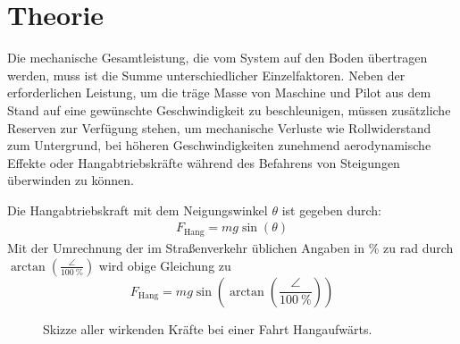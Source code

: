 \chapter{Theorie}
	Die mechanische Gesamtleistung, die vom System auf den Boden übertragen werden, muss ist die Summe unterschiedlicher Einzelfaktoren.
	Neben der erforderlichen Leistung, um die träge Masse von Maschine und Pilot aus dem Stand auf eine gewünschte Geschwindigkeit zu beschleunigen, müssen zusätzliche Reserven zur Verfügung stehen, um mechanische Verluste wie Rollwiderstand zum Untergrund, bei höheren Geschwindigkeiten zunehmend aerodynamische Effekte oder Hangabtriebskräfte während des Befahrens von Steigungen überwinden zu können.\par\medskip
	Die Hangabtriebskraft mit dem Neigungswinkel \(\theta\) ist gegeben durch:
	\begin{align}
		F_\text{Hang} = m g \sin\left(\theta\right)
		\label{eq:downhill force}
	\end{align}
	Mit der Umrechnung der im Straßenverkehr üblichen Angaben in \unit{\percent} zu \unit{\radian} durch \(\arctan\left(\frac{\angle}{\qty{100}{\percent}}\right)\) wird obige Gleichung zu
	\begin{equation}
		F_\text{Hang} = m g \sin\left(\arctan\left(\frac{\angle}{\qty{100}{\percent}}\right)\right)
		\label{eq:downhill force incline to radian}
	\end{equation}
	\begin{figure}[h]
		\centering
		
		\caption[Skizze aller wirkenden Kräfte bei einer Fahrt Hangaufwärts]{Skizze aller wirkenden Kräfte bei einer Fahrt Hangaufwärts.}%
		\label{fig:sketch torque incline}
	\end{figure}

